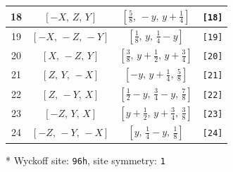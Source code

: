 \documentclass[fleqn,8pt]{jsarticle}
\begin{document}
\begin{longtable}{cccc}
18 & $\left[ - X,\, Z,\, Y \right]$ & $\left[ \frac{5}{8},\, - y,\, y + \frac{1}{4} \right]$ & {\tt [18]} \\ \hline
19 & $\left[ - X,\, - Z,\, - Y \right]$ & $\left[ \frac{1}{8},\, y,\, \frac{1}{4} - y \right]$ & {\tt [19]} \\ \hline
20 & $\left[ X,\, - Z,\, Y \right]$ & $\left[ \frac{3}{8},\, y + \frac{1}{2},\, y + \frac{3}{4} \right]$ & {\tt [20]} \\ \hline
21 & $\left[ Z,\, Y,\, - X \right]$ & $\left[ - y,\, y + \frac{1}{4},\, \frac{5}{8} \right]$ & {\tt [21]} \\ \hline
22 & $\left[ Z,\, - Y,\, X \right]$ & $\left[ \frac{1}{2} - y,\, \frac{3}{4} - y,\, \frac{7}{8} \right]$ & {\tt [22]} \\ \hline
23 & $\left[ - Z,\, Y,\, X \right]$ & $\left[ y + \frac{1}{2},\, y + \frac{3}{4},\, \frac{3}{8} \right]$ & {\tt [23]} \\ \hline
24 & $\left[ - Z,\, - Y,\, - X \right]$ & $\left[ y,\, \frac{1}{4} - y,\, \frac{1}{8} \right]$ & {\tt [24]} \\
\end{longtable}
* Wyckoff site: {\tt 96h}, site symmetry: {\tt 1}
\renewcommand{\arraystretch}{1.2}
\end{document}
